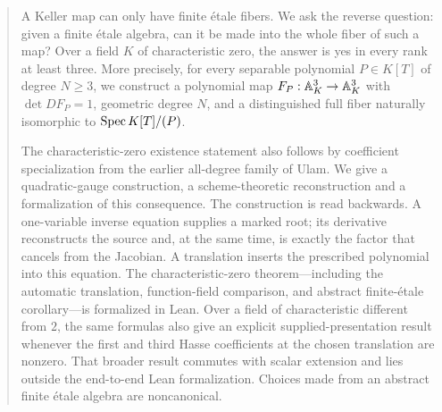 \begin{abstract}
A Keller map can only have finite \'etale fibers.  We ask the reverse
question: given a finite \'etale algebra, can it be made into the whole
fiber of such a map?  Over a field \(K\) of characteristic zero, the answer
is yes in every rank at least three.  More precisely, for every separable
polynomial \(P\in K[T]\) of degree \(N\geq3\), we construct a polynomial map
\(F_P:\A^3_K\to\A^3_K\) with \(\det DF_P=1\), geometric degree \(N\), and a
distinguished full fiber naturally isomorphic to \(\Spec K[T]/(P)\).

The characteristic-zero existence statement also follows by coefficient
specialization from the earlier all-degree family of Ulam. We give a
quadratic-gauge construction, a scheme-theoretic reconstruction and a
formalization of this consequence. The construction is read backwards.  A one-variable
inverse equation supplies a marked root; its derivative reconstructs the
source and, at the same time, is exactly the factor that cancels from the
Jacobian.  A translation inserts the prescribed polynomial into this
equation.  The characteristic-zero theorem---including the automatic
translation, function-field comparison, and abstract finite-\'etale
corollary---is formalized in Lean.  Over a field of characteristic different
from \(2\), the same formulas also give an explicit supplied-presentation
result whenever the first and third Hasse coefficients at the chosen
translation are nonzero.  That broader result commutes with scalar extension
and lies outside the end-to-end Lean formalization.  Choices made from an
abstract finite \'etale algebra are noncanonical.
\end{abstract}
